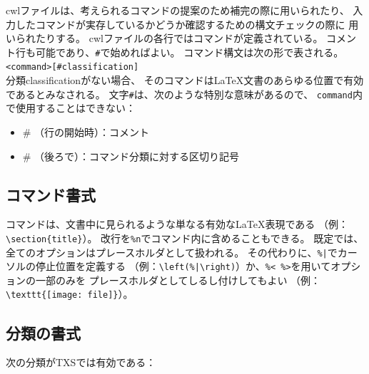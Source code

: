 cwlファイルは、考えられるコマンドの提案のため補完の際に用いられたり、
入力したコマンドが実存しているかどうか確認するための構文チェックの際に
用いられたりする。
cwlファイルの各行ではコマンドが定義されている。
コメント行も可能であり、\verb+#+で始めればよい。
コマンド構文は次の形で表される。\\

\verb+<command>[#classification]+\\

分類classificationがない場合、
そのコマンドはLaTeX文書のあらゆる位置で有効であるとみなされる。
文字\verb+#+は、次のような特別な意味があるので、
\verb+command+内で使用することはできない：

\begin{itemize}
\item
  \# （行の開始時）：コメント
\item
  \# （後ろで）：コマンド分類に対する区切り記号
\end{itemize}

\subsection{コマンド書式}

コマンドは、文書中に見られるような単なる有効なLaTeX表現である
（例：\verb+\section{title}+）。
改行を\verb+%n+でコマンド内に含めることもできる。
既定では、全てのオプションはプレースホルダとして扱われる。
その代わりに、\verb+%|+でカーソルの停止位置を定義する
（例：\verb+\left(%|\right)+）か、\verb+%< %>+を用いてオプションの一部のみを
プレースホルダとしてしるし付けしてもよい
（例：\verb+\texttt{[image: file]}+）。

\subsection{分類の書式}

次の分類がTXSでは有効である：

